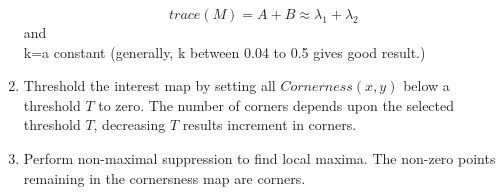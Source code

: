 \begin{enumerate}
\begin{equation}
trace(M)=A+B \approx \lambda_1+ \lambda_2
\label{eq:trace-M}
\end{equation}
and\\
k=a constant (generally, k between 0.04 to 0.5 gives good result.)

\item Threshold the interest map by setting all $Cornerness(x,y)$ below a threshold $T$ to zero. The number of corners depends upon the selected threshold $T$, decreasing $T$ results increment in corners.
\item Perform non-maximal suppression to find local maxima.
 The non-zero points remaining in the cornersness map are corners.					
	 
\end{enumerate}
